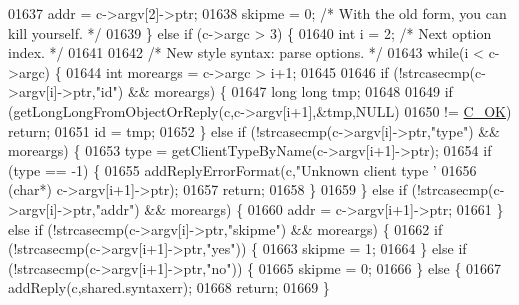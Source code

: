 \begin{DoxyCode}
{{{{{{{{{{{{{{{{{{{01637             addr = c->argv[2]->ptr;
01638             skipme = 0; \textcolor{comment}{/* With the old form, you can kill yourself. */}
01639         \} \textcolor{keywordflow}{else} \textcolor{keywordflow}{if} (c->argc > 3) \{
01640             \textcolor{keywordtype}{int} i = 2; \textcolor{comment}{/* Next option index. */}
01641 
01642             \textcolor{comment}{/* New style syntax: parse options. */}
01643             \textcolor{keywordflow}{while}(i < c->argc) \{
01644                 \textcolor{keywordtype}{int} moreargs = c->argc > i+1;
01645 
01646                 \textcolor{keywordflow}{if} (!strcasecmp(c->argv[i]->ptr,\textcolor{stringliteral}{"id"}) && moreargs) \{
01647                     \textcolor{keywordtype}{long} \textcolor{keywordtype}{long} tmp;
01648 
01649                     \textcolor{keywordflow}{if} (getLongLongFromObjectOrReply(c,c->argv[i+1],&tmp,NULL)
01650                         != \hyperlink{server_8h_a303769ef1065076e68731584e758d3e1}{C\_OK}) \textcolor{keywordflow}{return};
01651                     id = tmp;
01652                 \} \textcolor{keywordflow}{else} \textcolor{keywordflow}{if} (!strcasecmp(c->argv[i]->ptr,\textcolor{stringliteral}{"type"}) && moreargs) \{
01653                     type = getClientTypeByName(c->argv[i+1]->ptr);
01654                     \textcolor{keywordflow}{if} (type == -1) \{
01655                         addReplyErrorFormat(c,\textcolor{stringliteral}{"Unknown client type '%
01656                             (\textcolor{keywordtype}{char}*) c->argv[i+1]->ptr);
01657                         \textcolor{keywordflow}{return};
01658                     \}
01659                 \} \textcolor{keywordflow}{else} \textcolor{keywordflow}{if} (!strcasecmp(c->argv[i]->ptr,\textcolor{stringliteral}{"addr"}) && moreargs) \{
01660                     addr = c->argv[i+1]->ptr;
01661                 \} \textcolor{keywordflow}{else} \textcolor{keywordflow}{if} (!strcasecmp(c->argv[i]->ptr,\textcolor{stringliteral}{"skipme"}) && moreargs) \{
01662                     \textcolor{keywordflow}{if} (!strcasecmp(c->argv[i+1]->ptr,\textcolor{stringliteral}{"yes"})) \{
01663                         skipme = 1;
01664                     \} \textcolor{keywordflow}{else} \textcolor{keywordflow}{if} (!strcasecmp(c->argv[i+1]->ptr,\textcolor{stringliteral}{"no"})) \{
01665                         skipme = 0;
01666                     \} \textcolor{keywordflow}{else} \{
01667                         addReply(c,shared.syntaxerr);
01668                         \textcolor{keywordflow}{return};
01669                     \}
}}}}}}}}}}}}}}}}}}}}
\end{DoxyCode}
